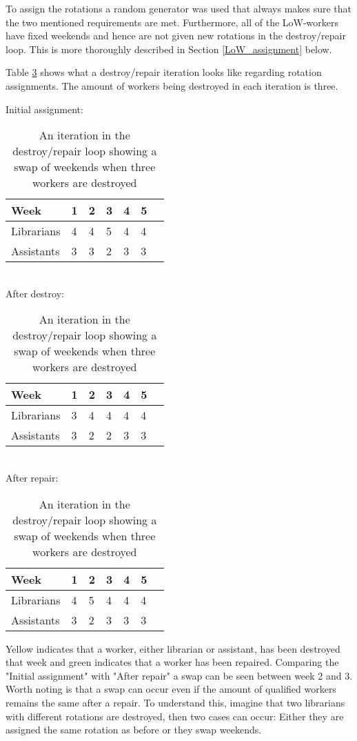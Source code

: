 To assign the rotations a random generator was used that always makes sure that the two mentioned requirements are met. Furthermore, all of the LoW-workers have fixed weekends and hence are not given new rotations in the destroy/repair loop. This is more thoroughly described in Section \ref{LoW_assignment} below. 

Table \ref{rotation_assignment} shows what a destroy/repair iteration looks like regarding rotation assignments. The amount of workers being destroyed in each iteration is three.

\begin{table}[!h]
\centering
\caption{An iteration in the destroy/repair loop showing a swap of weekends when three workers are destroyed}
\label{rotation_assignment}
Initial assignment:\\
\begin{tabular}{l|llllll}
\rowcolor[HTML]{C0C0C0}
Week       & 1 & 2 & 3 & 4 & 5  \\ \hline
Librarians & 4 & 4 & 5 & 4 & 4  \\ \hline
Assistants & 3 & 3 & 2 & 3 & 3 
\end{tabular}\\
After destroy:\\
\begin{tabular}{l|llllll}
\rowcolor[HTML]{C0C0C0}
Week       & 1                         & 2                         & 3                         & 4                         & 5                          \\ \hline
Librarians & \cellcolor[HTML]{FFFE65}3 & 4 & \cellcolor[HTML]{FFFE65}4 & 4 & 4  \\ \hline
Assistants & 3 & \cellcolor[HTML]{FFFE65}2 & 2 & 3 & 3
\end{tabular}\\
After repair:\\
\begin{tabular}{l|llllll}
\rowcolor[HTML]{C0C0C0}
Week       & 1 & 2 & 3 & 4 & 5  \\ \hline
Librarians & \cellcolor[HTML]{9AFF99}4 & \cellcolor[HTML]{9AFF99}5 & 4 & 4 & 4  \\ \hline
Assistants & 3 & 2 & \cellcolor[HTML]{9AFF99}3 & 3 & 3 
\end{tabular}
\end{table}

Yellow indicates that a worker, either librarian or assistant, has been destroyed that week and green indicates that a worker has been repaired. Comparing the "Initial assignment" with "After repair" a swap can be seen between week 2 and 3. Worth noting is that a swap can occur even if the amount of qualified workers remains the same after a repair. To understand this, imagine that two librarians with different rotations are destroyed, then two cases can occur: Either they are assigned the same rotation as before or they swap weekends. 


